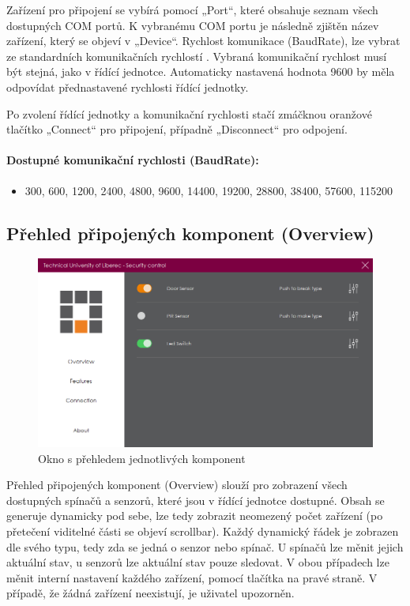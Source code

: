 \documentclass[FM,DP]{tulthesis}  %
\begin{document}
Zařízení pro připojení se vybírá pomocí „Port“, které obsahuje seznam všech dostupných COM portů. K vybranému COM portu je následně zjištěn název zařízení, který se objeví v „Device“. Rychlost komunikace (BaudRate), lze vybrat ze standardních komunikačních rychlostí \cite{BaudRates}. Vybraná komunikační rychlost musí být stejná, jako v řídící jednotce. Automaticky nastavená hodnota 9600 by měla odpovídat přednastavené rychlosti řídící jednotky. 

Po zvolení řídící jednotky a komunikační rychlosti stačí zmáčknou oranžové tlačítko „Connect“ pro připojení, případně „Disconnect“ pro odpojení.  

\paragraph{Dostupné komunikační rychlosti (BaudRate):}
\begin{itemize}
\item 300, 600, 1200, 2400, 4800, 9600, 14400, 19200, 28800, 38400, 57600, 115200
\end{itemize} 

\subsection{Přehled připojených komponent (Overview)}

\begin{figure}[H]
\begin{center}
\includegraphics[width=\textwidth]{images/overview.png}
\caption{Okno s přehledem jednotlivých komponent}
\label{image}
\end{center}
\end{figure}

Přehled připojených komponent (Overview) slouží pro zobrazení všech dostupných spínačů a senzorů, které jsou v řídící jednotce dostupné. Obsah se generuje dynamicky pod sebe, lze tedy zobrazit neomezený počet zařízení (po přetečení viditelné části se objeví scrollbar). Každý dynamický řádek je zobrazen dle svého typu, tedy zda se jedná o senzor nebo spínač. U spínačů lze měnit jejich aktuální stav, u senzorů lze aktuální stav pouze sledovat. V obou případech lze měnit interní nastavení každého zařízení, pomocí tlačítka na pravé straně. V případě, že žádná zařízení neexistují, je uživatel upozorněn. 
\end{document}
